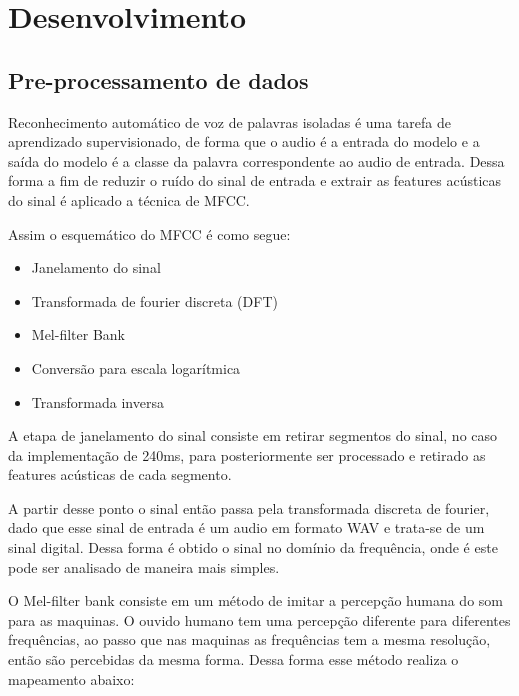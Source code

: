 \documentclass[
	12pt,				%
	openright,			%
	oneside,			%
	a4paper,			%
	chapter=TITLE,		%
	english,			%
	french,				%
	spanish,			%
	brazil				%
	]{abntex2}
\theoremstyle{definition}
\begin{document}


\chapter{Desenvolvimento}
\label{cap:referenciais_teoricos}

\section{Pre-processamento de dados}
Reconhecimento automático de voz de palavras isoladas é uma tarefa de aprendizado supervisionado, de forma que o audio é a entrada do modelo e a saída do modelo é a classe da palavra  correspondente ao audio de entrada. Dessa forma a fim de reduzir o ruído do sinal de entrada e extrair as features acústicas do sinal é aplicado a técnica de MFCC.

Assim o esquemático do MFCC é como segue:

\begin{itemize}
	\item Janelamento do sinal
	\item Transformada de fourier discreta (DFT)
	\item Mel-filter Bank
	\item Conversão para escala logarítmica
	\item Transformada inversa
\end{itemize}

A etapa de janelamento do sinal consiste em retirar segmentos do sinal, no caso da implementação de 240ms, para posteriormente ser processado e retirado as features acústicas de cada segmento.

A partir desse ponto o sinal então passa pela transformada discreta de fourier, dado que esse sinal de entrada é um audio em formato WAV e trata-se de um sinal digital. Dessa forma é obtido o sinal no domínio da frequência, onde é este pode ser analisado de maneira mais simples.

O Mel-filter bank consiste em um método de imitar a percepção humana do som para as maquinas. O ouvido humano tem uma percepção diferente para diferentes frequências, ao passo que nas maquinas as frequências tem a mesma resolução, então são percebidas da mesma forma. Dessa forma esse método realiza o mapeamento abaixo:
\end{document}
